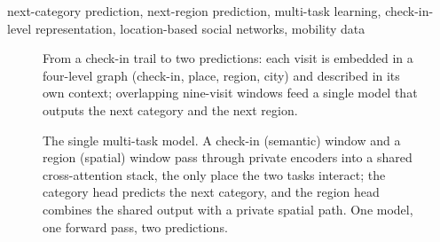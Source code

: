 \documentclass[conference]{IEEEtran}
\begin{document}
\begin{IEEEkeywords}
next-category prediction, next-region prediction, multi-task learning,
check-in-level representation, location-based social networks, mobility data
\end{IEEEkeywords}




\begin{figure}[t]\centering

\caption{From a check-in trail to two predictions: each visit is embedded in a four-level graph
(check-in, place, region, city) and described in its own context; overlapping nine-visit windows
feed a single model that outputs the next category and the next region.}
\label{fig:dataflow}
\end{figure}     %




\begin{figure}[t]\centering

\caption{The single multi-task model. A check-in (semantic) window and a region (spatial) window
pass through private encoders into a shared cross-attention stack, the only place the two tasks
interact; the category head predicts the next category, and the region head combines the shared output with a
private spatial path. One model, one forward pass, two predictions.}
\label{fig:model}
\end{figure}        %











\end{document}
